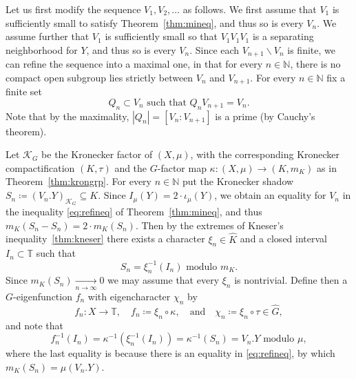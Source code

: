 \documentclass{amsart}
\numberwithin{equation}{subsection}
\theoremstyle{remark}
\begin{document}
Let us first modify the sequence \(V_{1},V_{2},\dotsc\) as follows. We first assume that \(V_{1}\) is sufficiently small to satisfy Theorem~\ref{thm:mineq}, and thus so is every \(V_{n}\). We assume further that \(V_{1}\) is sufficiently small so that \(V_{1}V_{1}V_{1}\) is a separating neighborhood for \(Y\), and thus so is every \(V_{n}\). Since each \(V_{n+1}\backslash V_{n}\) is finite, we can refine the sequence into a maximal one, in that for every \(n\in\mathbb{N}\), there is no compact open subgroup lies strictly between \(V_{n}\) and \(V_{n+1}\). For every \(n\in\mathbb{N}\) fix a finite set
\[Q_{n}\subset V_{n}\text{ such that }Q_{n}V_{n+1}=V_{n}.\]
Note that by the maximality, \(\left|Q_{n}\right|=\left[V_{n}:V_{n+1}\right]\) is a prime (by Cauchy's theorem).

Let \(\mathcal{K}_{G}\) be the Kronecker factor of \(\left(X,\mu\right)\), with the corresponding Kronecker compactification \(\left(K,\tau\right)\) and the \(G\)-factor map \(\kappa:\left(X,\mu\right)\to\left(K,m_{K}\right)\) as in Theorem~\ref{thm:krongrp}. For every \(n\in\mathbb{N}\) put the Kronecker shadow \(S_{n}\coloneqq \left(V_{n}.Y\right)_{\mathcal{K}_{G}}\subseteq K\). Since \(I_{\mu}\left(Y\right)=2\cdot\iota_{\mu}\left(Y\right)\), we obtain an equality for \(V_{n}\) in the inequality \eqref{eq:refineq} of Theorem~\ref{thm:mineq}, and thus \(m_{K}\left(S_{n}-S_{n}\right)=2\cdot m_{K}\left(S_{n}\right)\). Then by the extremes of Kneser's inequality~\ref{thm:kneser} there exists a character \(\xi_{n}\in\widehat{K}\) and a closed interval \(I_{n}\subset\mathbb{T}\) such that
\[S_{n}=\xi_{n}^{-1}\left(I_{n}\right)\text{ modulo }m_{K}.\]
Since \(m_{K}\left(S_{n}\right)\xrightarrow[n\to\infty]{}0\) we may assume that every \(\xi_{n}\) is nontrivial. Define then a \(G\)-eigenfunction \(f_{n}\) with eigencharacter \(\chi_{n}\) by
\[f_{n}:X\to\mathbb{T},\quad f_{n}\coloneqq \xi_{n}\circ\kappa,\quad\text{and}\quad\chi_{n}\coloneqq \xi_{n}\circ\tau\in\widehat{G},\]
and note that
\[f_{n}^{-1}\left(I_{n}\right)=\kappa^{-1}\left(\xi_{n}^{-1}\left(I_{n}\right)\right)=\kappa^{-1}\left(S_{n}\right)=V_{n}.Y\text{ modulo }\mu,\]
where the last equality is because there is an equality in \eqref{eq:refineq}, by which \(m_{K}\left(S_{n}\right)=\mu\left(V_{n}.Y\right)\).
\end{document}
